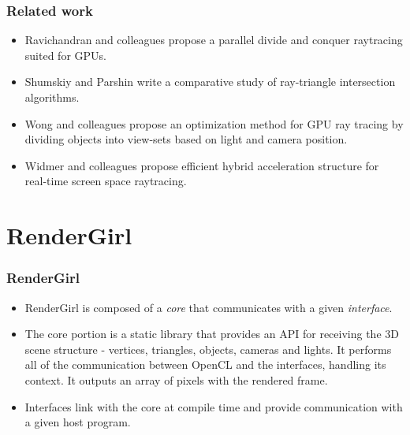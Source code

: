 \documentclass{beamer}
\begin{document}
\begin{frame}
\frametitle{Related work}

\begin{itemize}

\item Ravichandran and colleagues propose a parallel divide and
  conquer raytracing suited for GPUs\cite{Ravichandran}.

\item Shumskiy and Parshin write a comparative study of ray-triangle
  intersection algorithms\cite{Shumskiy}.

\item Wong and colleagues propose an optimization method for GPU ray
  tracing by dividing objects into view-sets based on light and camera
  position\cite{Wong}.

\item Widmer and colleagues propose efficient hybrid acceleration
  structure for real-time screen space raytracing\cite{Widmer}.

\end{itemize}

\end{frame}

\section{RenderGirl}
\begin{frame}
\frametitle{RenderGirl}

\begin{itemize}

\item RenderGirl is composed of a \emph{core} that communicates with a
  given \emph{interface}.

\item The core portion is a static library that provides an API for
  receiving the 3D scene structure - vertices, triangles, objects,
  cameras and lights. It performs all of the communication between
  OpenCL and the interfaces, handling its context. It outputs an array
  of pixels with the rendered frame.

\item Interfaces link with the core at compile time and provide
  communication with a given host program.

\end{itemize}

\end{frame}
\end{document}
